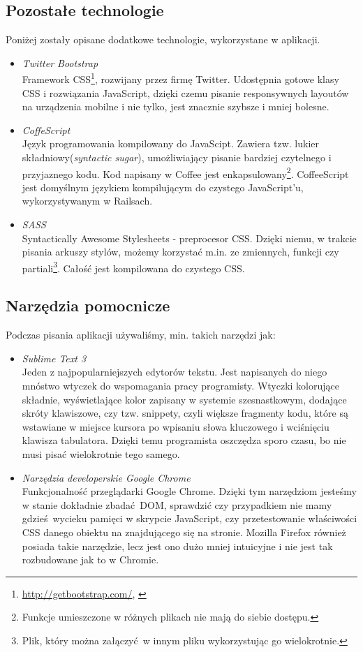   \subsection{Pozostałe technologie}
    \label{other_technology}
    Poniżej zostały opisane dodatkowe technologie, wykorzystane w aplikacji.
    \begin{itemize}
      \item \emph{Twitter Bootstrap} \\ Framework CSS\footnote{\url{http://getbootstrap.com/}, \cite{bootstrap}}, rozwijany przez firmę Twitter. Udostępnia gotowe klasy CSS i rozwiązania JavaScript, dzięki czemu pisanie responsywnych layoutów na urządzenia mobilne i nie tylko, jest znacznie szybsze i mniej bolesne.
      \item \emph{CoffeScript} \\ Język programowania kompilowany do JavaScipt\cite{coffee}. Zawiera tzw. lukier składniowy(\emph{syntactic sugar}), umożliwiający pisanie bardziej czytelnego i przyjaznego kodu. Kod napisany w Coffee jest enkapsulowany\footnote{Funkcje umieszczone w różnych plikach nie mają do siebie dostępu.}. CoffeeScript jest domyślnym językiem kompilującym do czystego JavaScript'u, wykorzystywanym w Railsach.
      \item \emph{SASS} \\ Syntactically Awesome Stylesheets\cite{sass} - preprocesor CSS. Dzięki niemu, w trakcie pisania arkuszy stylów, możemy korzystać m.in. ze zmiennych, funkcji czy partiali\footnote{Plik, który można załączyć w innym pliku wykorzystując go wielokrotnie.}. Całość jest kompilowana do czystego CSS.
    \end{itemize}
  \subsection{Narzędzia pomocnicze}
    Podczas pisania aplikacji używaliśmy, min. takich narzędzi jak:
    \begin{itemize}
      \item \emph{Sublime Text 3} \\ Jeden z najpopularniejszych edytorów tekstu. Jest napisanych do niego mnóstwo wtyczek do wspomagania pracy programisty. Wtyczki kolorujące składnie, wyświetlające kolor zapisany w systemie szesnastkowym, dodające skróty klawiszowe, czy tzw. snippety, czyli większe fragmenty kodu, które są wstawiane w miejsce kursora po wpisaniu słowa kluczowego i wciśnięciu klawisza tabulatora. Dzięki temu programista oszczędza sporo czasu, bo nie musi pisać wielokrotnie tego samego.
      \item \emph{Narzędzia developerskie Google Chrome} \\ Funkcjonalność przeglądarki Google Chrome. Dzięki tym narzędziom jesteśmy w stanie dokładnie zbadać DOM, sprawdzić czy przypadkiem nie mamy gdzieś wycieku pamięci w skrypcie JavaScript, czy przetestowanie właściwości CSS danego obiektu na znajdującego się na stronie. Mozilla Firefox również posiada takie narzędzie, lecz jest ono dużo mniej intuicyjne i nie jest tak rozbudowane jak to w Chromie.
    \end{itemize}
